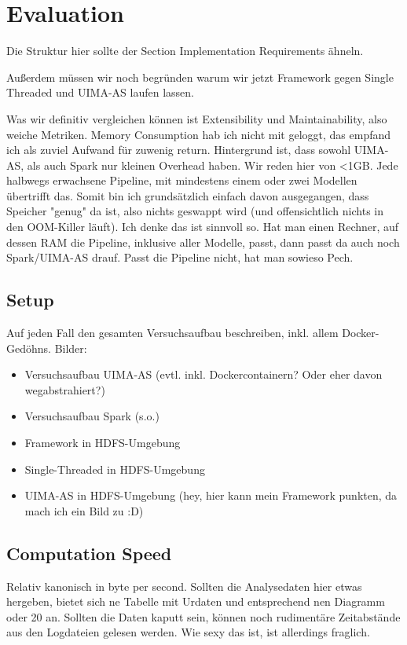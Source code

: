 \chapter{Evaluation}
Die Struktur hier sollte der Section Implementation Requirements ähneln.

Außerdem müssen wir noch begründen warum wir jetzt Framework gegen Single Threaded und UIMA-AS laufen lassen.

Was wir definitiv vergleichen können ist Extensibility und Maintainability, also weiche Metriken. Memory Consumption hab ich nicht mit geloggt, das empfand ich als zuviel Aufwand für zuwenig return. Hintergrund ist, dass sowohl UIMA-AS, als auch Spark nur kleinen Overhead haben. Wir reden hier von <1GB. Jede halbwegs erwachsene Pipeline, mit mindestens einem oder zwei Modellen übertrifft das. Somit bin ich grundsätzlich einfach davon ausgegangen, dass Speicher "genug" da ist, also nichts geswappt wird (und offensichtlich nichts in den OOM-Killer läuft). Ich denke das ist sinnvoll so. Hat man einen Rechner, auf dessen RAM die Pipeline, inklusive aller Modelle, passt, dann passt da auch noch Spark/UIMA-AS drauf. Passt die Pipeline nicht, hat man sowieso Pech.

\section{Setup}

Auf jeden Fall den gesamten Versuchsaufbau beschreiben, inkl. allem Docker-Gedöhns. 
Bilder:
\begin{itemize}
	\item Versuchsaufbau UIMA-AS (evtl. inkl. Dockercontainern? Oder eher davon wegabstrahiert?)
	\item Versuchsaufbau Spark (s.o.)
	\item Framework in HDFS-Umgebung
	\item Single-Threaded in HDFS-Umgebung
	\item UIMA-AS in HDFS-Umgebung (hey, hier kann mein Framework punkten, da mach ich ein Bild zu :D)
	
\end{itemize}

\section{Computation Speed}

Relativ kanonisch in byte per second. Sollten die Analysedaten hier etwas hergeben, bietet sich ne Tabelle mit Urdaten und entsprechend nen Diagramm oder 20 an. Sollten die Daten kaputt sein, können noch rudimentäre Zeitabstände aus den Logdateien gelesen werden. Wie sexy das ist, ist allerdings fraglich.

